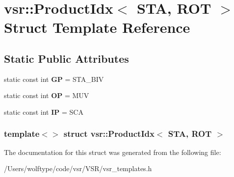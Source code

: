 \hypertarget{structvsr_1_1_product_idx_3_01_s_t_a_00_01_r_o_t_01_4}{\section{vsr\-:\-:Product\-Idx$<$ S\-T\-A, R\-O\-T $>$ Struct Template Reference}
\label{structvsr_1_1_product_idx_3_01_s_t_a_00_01_r_o_t_01_4}
}
\subsection*{Static Public Attributes}
\begin{DoxyCompactItemize}
\item 
\hypertarget{structvsr_1_1_product_idx_3_01_s_t_a_00_01_r_o_t_01_4_af67b2a3304c61028b5bfa0b2a2d12646}{static const int {\bfseries G\-P} = S\-T\-A\-\_\-\-B\-I\-V}\label{structvsr_1_1_product_idx_3_01_s_t_a_00_01_r_o_t_01_4_af67b2a3304c61028b5bfa0b2a2d12646}

\item 
\hypertarget{structvsr_1_1_product_idx_3_01_s_t_a_00_01_r_o_t_01_4_ab5e1e9cb02be95ee0e867a44453d430a}{static const int {\bfseries O\-P} = M\-U\-V}\label{structvsr_1_1_product_idx_3_01_s_t_a_00_01_r_o_t_01_4_ab5e1e9cb02be95ee0e867a44453d430a}

\item 
\hypertarget{structvsr_1_1_product_idx_3_01_s_t_a_00_01_r_o_t_01_4_a38b13e708cfcd711d9af014e68abed78}{static const int {\bfseries I\-P} = S\-C\-A}\label{structvsr_1_1_product_idx_3_01_s_t_a_00_01_r_o_t_01_4_a38b13e708cfcd711d9af014e68abed78}

\end{DoxyCompactItemize}
\subsubsection*{template$<$$>$ struct vsr\-::\-Product\-Idx$<$ S\-T\-A, R\-O\-T $>$}



The documentation for this struct was generated from the following file\-:\begin{DoxyCompactItemize}
\item 
/\-Users/wolftype/code/vsr/\-V\-S\-R/vsr\-\_\-templates.\-h\end{DoxyCompactItemize}
